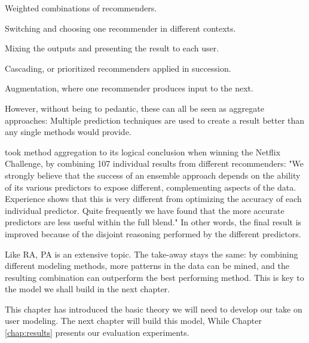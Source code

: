 \begin{itemize*}
  \item Weighted combinations of recommenders.
  \item Switching and choosing one recommender in different contexts.
  \item Mixing the outputs and presenting the result to each user.
  \item Cascading, or prioritized recommenders applied in succession.
  \item Augmentation, where one recommender produces input to the next.
\end{itemize*}

However, without being to pedantic, these can all be seen as aggregate approaches: Multiple prediction techniques are used
to create a result better than any single methods would provide.

\cite{Bell2007} took method aggregation to its logical conclusion when winning the Netflix Challenge,
by combining 107 individual results from different recommenders: 
"We strongly believe that the success of an ensemble approach depends on the ability of its various predictors to expose different, 
complementing aspects of the data. Experience shows that this is very different from optimizing the accuracy of each individual predictor. 
Quite frequently we have found that the more accurate predictors are less useful within the full blend." \cite[p6]{Bell2007}
In other words, the final result is improved because of the disjoint reasoning performed by the different predictors.

Like RA, PA is an extensive topic.
The take-away stays the same: by combining different modeling methods,
more patterns in the data can be mined, and 
the resulting combination can outperform the best performing method.
This is key to the model we shall build in the next chapter.

\hr

This chapter has introduced the basic theory we will need to develop our take on user modeling.
The next chapter will build this model,
While Chapter \ref{chap:results} presents our evaluation experiments.



